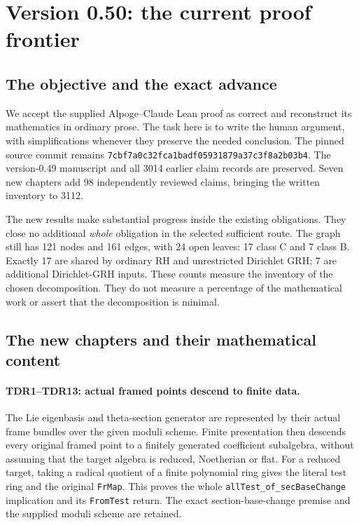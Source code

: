 \section{Version 0.50: the current proof frontier}
\label{sec:dependency-audit-v50}

\subsection{The objective and the exact advance}

We accept the supplied Alpoge--Claude Lean proof as correct and reconstruct
its mathematics in ordinary prose. The task here is to write the human
argument, with simplifications whenever they preserve the needed conclusion.
The pinned source commit remains
\texttt{7cbf7a0c32fca1badf05931879a37c3f8a2b03b4}.
The version-0.49 manuscript and all 3014 earlier claim records are
preserved. Seven new chapters add 98 independently reviewed claims,
bringing the written inventory to 3112.

The new results make substantial progress inside the existing obligations.
They close no additional \emph{whole} obligation in the selected sufficient
route. The graph still has 121 nodes and 161 edges, with 24 open leaves:
17 class C and 7 class B. Exactly 17 are shared by ordinary RH and
unrestricted Dirichlet GRH; 7 are additional Dirichlet-GRH inputs.
These counts measure the inventory of the chosen decomposition. They do
not measure a percentage of the mathematical work or assert that the
decomposition is minimal.

\subsection{The new chapters and their mathematical content}

\paragraph{TDR1--TDR13: actual framed points descend to finite data.}
The Lie eigenbasis and theta-section generator are represented by their
actual frame bundles over the given moduli scheme. Finite presentation
then descends every original framed point to a finitely generated
coefficient subalgebra, without assuming that the target algebra is
reduced, Noetherian or flat. For a reduced target, taking a radical
quotient of a finite polynomial ring gives the literal test ring and
the original \texttt{Fr\allowbreak Map}. This proves the whole
\texttt{all\allowbreak Test\_\allowbreak of\_\allowbreak sec\allowbreak Base\allowbreak Change} implication and its
\texttt{From\allowbreak Test} return. The exact section-base-change premise and
the supplied moduli scheme are retained.

